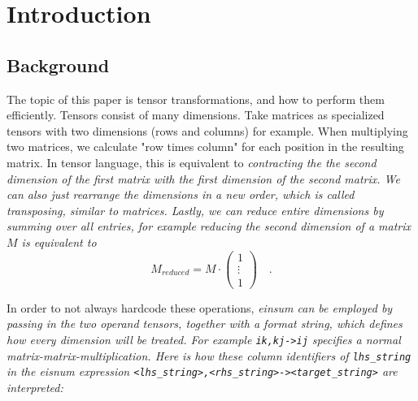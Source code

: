 \documentclass[sigconf]{acmart}
\begin{document}


\maketitle

\let\thefootnote\relax{}


\section{Introduction}
\subsection{Background}
The topic of this paper is tensor transformations, and how to perform them efficiently. Tensors consist of many dimensions. Take matrices as specialized tensors with two dimensions (rows and columns) for example. When multiplying two matrices, we calculate "row times column" for each position in the resulting matrix. In tensor language, this is equivalent to \em contracting \em the the second dimension of the first matrix with the first dimension of the second matrix. We can also just rearrange the dimensions in a new order, which is called  \em transposing\em , similar to matrices. Lastly, we can \em reduce \em entire dimensions by summing over all entries, for example reducing the second dimension of a matrix $M$ is equivalent to
\[ M_{reduced} = M \cdot \begin{pmatrix}
  1 \\
  \vdots \\
  1
\end{pmatrix} \quad . \]

In order to not always hardcode these operations, \em einsum \em can be employed by passing in the two operand tensors, together with a format string, which defines how every dimension will be treated. For example \texttt{ik,kj->ij} specifies a normal matrix-matrix-multiplication. Here is how these \em column identifiers \em of \texttt{lhs\_string} in the eisnum expression \texttt{<lhs\_string>,<rhs\_string>-><target\_string>} are interpreted:
\end{document}
